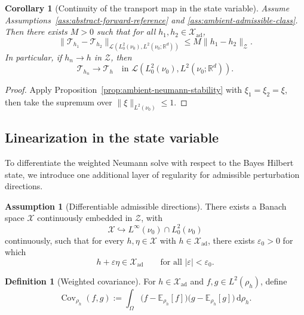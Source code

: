 \documentclass{article}
\newtheorem{corollary}[theorem]{Corollary}
\theoremstyle{definition}
\newtheorem{definition}[theorem]{Definition}
\newtheorem{assumption}[theorem]{Assumption}
\renewcommand{\d}{\mathrm{d}}
\begin{document}
\begin{corollary}[Continuity of the transport map in the state variable]
    \label{cor:ambient-transport-map-hsprime}
    Assume Assumptions~\ref{ass:abstract-forward-reference} and
    \ref{ass:ambient-admissible-class}. Then there exists \(M>0\) such that for all
    \(h_1,h_2\in\mathcal X_{\mathrm{ad}}\),
    \[
        \|\mathcal T_{h_1}-\mathcal T_{h_2}\|_{\mathcal L(L^2_0(\nu_0),L^2(\nu_0;\mathbb R^d))}
        \le
        M\|h_1-h_2\|_{\mathcal Z}.
    \]
    In particular, if \(h_n\to h\) in \(\mathcal Z\), then
    \[
        \mathcal T_{h_n}\to \mathcal T_h
        \quad\text{in }\mathcal L(L^2_0(\nu_0),L^2(\nu_0;\mathbb R^d)).
    \]
\end{corollary}

\begin{proof}
    Apply Proposition~\ref{prop:ambient-neumann-stability} with \(\xi_1=\xi_2=\xi\), then take
    the supremum over \(\|\xi\|_{L^2(\nu_0)}\le 1\).
\end{proof}

\subsection{Linearization in the state variable}

To differentiate the weighted Neumann solve with respect to the Bayes Hilbert state, we
introduce one additional layer of regularity for admissible perturbation directions.

\begin{assumption}[Differentiable admissible directions]
    \label{ass:abstract-forward-differentiable}
    There exists a Banach space \(\mathcal X\) continuously embedded in \(\mathcal Z\), with
    \[
        \mathcal X \hookrightarrow L^\infty(\nu_0)\cap L^2_0(\nu_0)
    \]
    continuously, such that for every \(h,\eta\in\mathcal X\) with
    \(h\in\mathcal X_{\mathrm{ad}}\), there exists \(\varepsilon_0>0\) for which
    \[
        h+\varepsilon\eta\in\mathcal X_{\mathrm{ad}}
        \qquad
        \text{for all }|\varepsilon|<\varepsilon_0.
    \]
\end{assumption}

\begin{definition}[Weighted covariance]
    \label{def:weighted-covariance}
    For \(h\in \mathcal X_{\mathrm{ad}}\) and \(f,g\in L^2(\rho_h)\), define
    \[
        \operatorname{Cov}_{\rho_h}(f,g)
        :=
        \int_\Omega
        \bigl(f-\mathbb E_{\rho_h}[f]\bigr)
        \bigl(g-\mathbb E_{\rho_h}[g]\bigr)\,\d\rho_h.
    \]
\end{definition}
\end{document}
